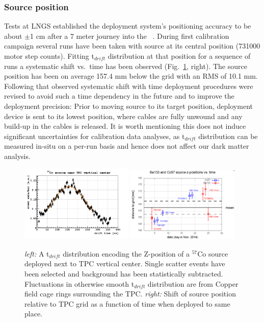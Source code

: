 \subsubsection{Source position}
Tests at LNGS established the deployment system's positioning accuracy to be about $\pm$1 cm after a 7 meter journey into the \dsf\ \lsv.
During first calibration campaign several runs have been taken with source at its central position (731000 motor step counts). Fitting t$_{drift}$ distribution at that position for a sequence of runs a systematic shift vs.~time has been observed (Fig.~\ref{fig:SourcePosition}, right). The source position has been on average 157.4 mm below the grid with an RMS of 10.1 mm. Following that observed systematic shift with time deployment procedures were revised to avoid such a time dependency in the future and to improve the deployment precision: Prior to moving source to its target position, deployment device is sent to its lowest position, where cables are fully unwound and any build-up in the cables is released. It is worth mentioning this does not induce significant uncertainties for calibration data analyses, as t$_{drift}$ distribution can be measured in-situ on a per-run basis and hence does not affect our dark matter analysis.
\begin{figure}[htbp]
\centering
\includegraphics[width=0.48\textwidth]{./Figures/Tdrift_distribution_Co57.png}
\includegraphics[width=0.48\textwidth]{./Figures/SourcePosition_vs_time_DocDB1288.png}
\caption{\textit{left:} A t$_{drift}$ distribution encoding the Z-position of a $^{57}$Co source deployed next to TPC vertical center. Single scatter events have been selected and background has been statistically subtracted. Fluctuations in otherwise smooth t$_{drift}$ distribution are from Copper field cage rings surrounding the TPC.
\textit{right:} Shift of source position relative to TPC grid as a function of time when deployed to same place.
\label{fig:SourcePosition}} 
\end{figure}

